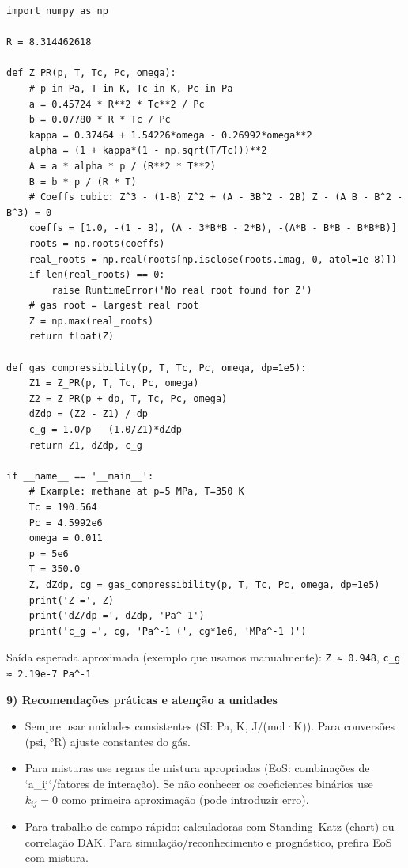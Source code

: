 \documentclass[11pt,a4paper]{article}
\begin{document}
\begin{verbatim}
import numpy as np

R = 8.314462618

def Z_PR(p, T, Tc, Pc, omega):
    # p in Pa, T in K, Tc in K, Pc in Pa
    a = 0.45724 * R**2 * Tc**2 / Pc
    b = 0.07780 * R * Tc / Pc
    kappa = 0.37464 + 1.54226*omega - 0.26992*omega**2
    alpha = (1 + kappa*(1 - np.sqrt(T/Tc)))**2
    A = a * alpha * p / (R**2 * T**2)
    B = b * p / (R * T)
    # Coeffs cubic: Z^3 - (1-B) Z^2 + (A - 3B^2 - 2B) Z - (A B - B^2 - B^3) = 0
    coeffs = [1.0, -(1 - B), (A - 3*B*B - 2*B), -(A*B - B*B - B*B*B)]
    roots = np.roots(coeffs)
    real_roots = np.real(roots[np.isclose(roots.imag, 0, atol=1e-8)])
    if len(real_roots) == 0:
        raise RuntimeError('No real root found for Z')
    # gas root = largest real root
    Z = np.max(real_roots)
    return float(Z)

def gas_compressibility(p, T, Tc, Pc, omega, dp=1e5):
    Z1 = Z_PR(p, T, Tc, Pc, omega)
    Z2 = Z_PR(p + dp, T, Tc, Pc, omega)
    dZdp = (Z2 - Z1) / dp
    c_g = 1.0/p - (1.0/Z1)*dZdp
    return Z1, dZdp, c_g

if __name__ == '__main__':
    # Example: methane at p=5 MPa, T=350 K
    Tc = 190.564
    Pc = 4.5992e6
    omega = 0.011
    p = 5e6
    T = 350.0
    Z, dZdp, cg = gas_compressibility(p, T, Tc, Pc, omega, dp=1e5)
    print('Z =', Z)
    print('dZ/dp =', dZdp, 'Pa^-1')
    print('c_g =', cg, 'Pa^-1 (', cg*1e6, 'MPa^-1 )')
\end{verbatim}

Saída esperada aproximada (exemplo que usamos manualmente): \texttt{Z ≈ 0.948}, \texttt{c_g ≈ 2.19e-7 Pa^-1}.

\textbf{9) Recomendações práticas e atenção a unidades}

\begin{itemize}
\item Sempre usar unidades consistentes (SI: Pa, K, J/(mol·K)). Para conversões (psi, °R) ajuste constantes do gás.  
\item Para misturas use regras de mistura apropriadas (EoS: combinações de `a_{ij}`/fatores de interação). Se não conhecer os coeficientes binários use $k_{ij}=0$ como primeira aproximação (pode introduzir erro).  
\item Para trabalho de campo rápido: calculadoras com Standing–Katz (chart) ou correlação DAK. Para simulação/reconhecimento e prognóstico, prefira EoS com mistura.
\end{itemize}
\end{document}
